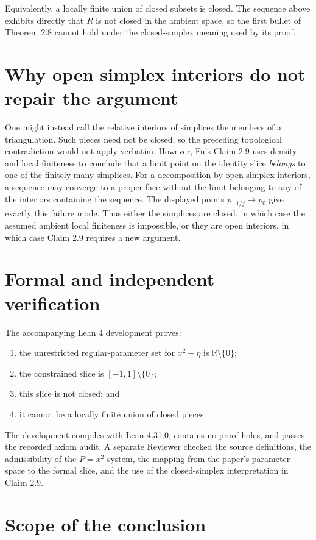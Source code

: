 \documentclass[11pt]{article}
\newcommand{\R}{\mathbb{R}}
\begin{document}
Equivalently, a locally finite union of closed subsets is closed.  The
sequence above exhibits directly that $R$ is not closed in the ambient space,
so the first bullet of Theorem 2.8 cannot hold under the closed-simplex
meaning used by its proof.

\section{Why open simplex interiors do not repair the argument}

One might instead call the relative interiors of simplices the members of a
triangulation.  Such pieces need not be closed, so the preceding topological
contradiction would not apply verbatim.  However, Fu's Claim 2.9 uses density
and local finiteness to conclude that a limit point on the identity slice
\emph{belongs} to one of the finitely many simplices.  For a decomposition by
open simplex interiors, a sequence may converge to a proper face without the
limit belonging to any of the interiors containing the sequence.  The
displayed points $p_{-1/j}\to p_0$ give exactly this failure mode.  Thus either
the simplices are closed, in which case the assumed ambient local finiteness
is impossible, or they are open interiors, in which case Claim 2.9 requires a
new argument.

\section{Formal and independent verification}

The accompanying Lean 4 development proves:
\begin{enumerate}
  \item the unrestricted regular-parameter set for $x^2-\eta$ is
  $\R\setminus\{0\}$;
  \item the constrained slice is $[-1,1]\setminus\{0\}$;
  \item this slice is not closed; and
  \item it cannot be a locally finite union of closed pieces.
\end{enumerate}
The development compiles with Lean 4.31.0, contains no proof holes, and passes
the recorded axiom audit.  A separate Reviewer checked the source definitions,
the admissibility of the $P=x^2$ system, the mapping from the paper's parameter
space to the formal slice, and the use of the closed-simplex interpretation in
Claim 2.9.

\section{Scope of the conclusion}
\end{document}
